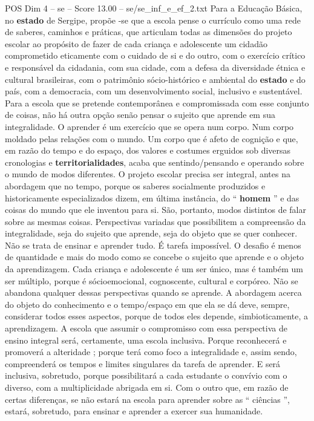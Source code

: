\begin{textsample}{POS Dim 4 – se – Score 13.00 – se/se\_inf\_e\_ef\_2.txt}
Para a Educação Básica, no \textbf{estado} de Sergipe, propõe -se que a escola pense o currículo como uma rede de saberes, caminhos e práticas, que articulam todas as dimensões do projeto escolar ao propósito de fazer de cada criança e adolescente um cidadão comprometido eticamente com o cuidado de si e do outro, com o exercício crítico e responsável da cidadania, com sua cidade, com a defesa da diversidade étnica e cultural brasileiras, com o patrimônio sócio-histórico e ambiental do \textbf{estado} e do país, com a democracia, com um desenvolvimento social, inclusivo e sustentável.
Para a escola que se pretende contemporânea e compromissada com esse conjunto de coisas, não há outra opção senão pensar o sujeito que aprende em sua integralidade.
O aprender é um exercício que se opera num corpo.
Num corpo moldado pelas relações com o mundo.
Um corpo que é afeto de cognição e que, em razão do tempo e do espaço, dos valores e costumes erguidos sob diversas cronologias e \textbf{territorialidades}, acaba que sentindo/pensando e operando sobre o mundo de modos diferentes.
O projeto escolar precisa ser integral, antes na abordagem que no tempo, porque os saberes socialmente produzidos e historicamente especializados dizem, em última instância, do “ \textbf{homem} ” e das coisas do mundo que ele inventou para si.
São, portanto, modos distintos de falar sobre as mesmas coisas.
Perspectivas variadas que possibilitem a compreensão da integralidade, seja do sujeito que aprende, seja do objeto que se quer conhecer.
Não se trata de ensinar e aprender tudo.
É tarefa impossível.
O desafio é menos de quantidade e mais do modo como se concebe o sujeito que aprende e o objeto da aprendizagem.
Cada criança e adolescente é um ser único, mas é também um ser múltiplo, porque é sócioemocional, cognoscente, cultural e corpóreo.
Não se abandona qualquer dessas perspectivas quando se aprende.
A abordagem acerca do objeto do conhecimento e o tempo/espaço em que ela se dá deve, sempre, considerar todos esses aspectos, porque de todos eles depende, simbioticamente, a aprendizagem.
A escola que assumir o compromisso com essa perspectiva de ensino integral será, certamente, uma escola inclusiva.
Porque reconhecerá e promoverá a alteridade ; porque terá como foco a integralidade e, assim sendo, compreenderá os tempos e limites singulares da tarefa de aprender.
E será inclusiva, sobretudo, porque possibilitará a cada estudante o convívio com o diverso, com a multiplicidade abrigada em si.
Com o outro que, em razão de certas diferenças, se não estará na escola para aprender sobre as “ ciências ”, estará, sobretudo, para ensinar e aprender a exercer sua humanidade.

\end{textsample}
